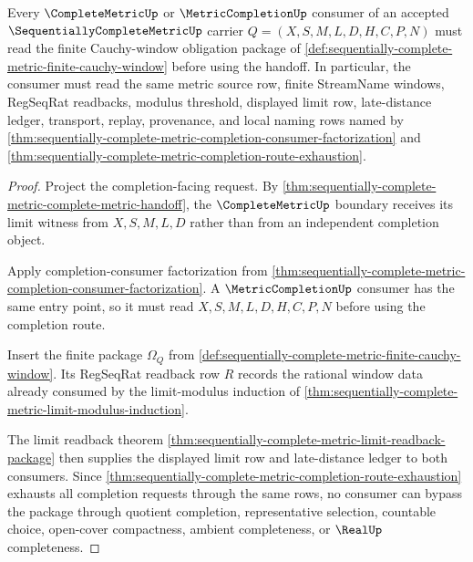 \begin{theorem}
\label{thm:sequentially-complete-metric-completion-handoff-obligations}
Every $\CompleteMetricUp$ or $\MetricCompletionUp$ consumer of an accepted $\SequentiallyCompleteMetricUp$ carrier $Q=(X,S,M,L,D,H,C,P,N)$ must read the finite Cauchy-window obligation package of \autoref{def:sequentially-complete-metric-finite-cauchy-window} before using the handoff. In particular, the consumer must read the same metric source row, finite StreamName windows, RegSeqRat readbacks, modulus threshold, displayed limit row, late-distance ledger, transport, replay, provenance, and local naming rows named by \autoref{thm:sequentially-complete-metric-completion-consumer-factorization} and \autoref{thm:sequentially-complete-metric-completion-route-exhaustion}.
\end{theorem}
\begin{proof}
Project the completion-facing request. By \autoref{thm:sequentially-complete-metric-complete-metric-handoff}, the $\CompleteMetricUp$ boundary receives its limit witness from $X,S,M,L,D$ rather than from an independent completion object.

Apply completion-consumer factorization from \autoref{thm:sequentially-complete-metric-completion-consumer-factorization}. A $\MetricCompletionUp$ consumer has the same entry point, so it must read $X,S,M,L,D,H,C,P,N$ before using the completion route.

Insert the finite package $\Omega_Q$ from \autoref{def:sequentially-complete-metric-finite-cauchy-window}. Its RegSeqRat readback row $R$ records the rational window data already consumed by the limit-modulus induction of \autoref{thm:sequentially-complete-metric-limit-modulus-induction}.

The limit readback theorem \autoref{thm:sequentially-complete-metric-limit-readback-package} then supplies the displayed limit row and late-distance ledger to both consumers. Since \autoref{thm:sequentially-complete-metric-completion-route-exhaustion} exhausts all completion requests through the same rows, no consumer can bypass the package through quotient completion, representative selection, countable choice, open-cover compactness, ambient completeness, or $\RealUp$ completeness.
\end{proof}

